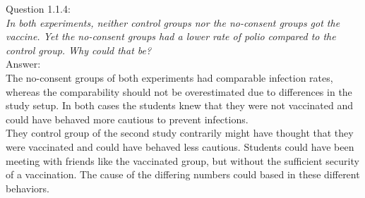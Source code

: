 
Question 1.1.4:\\	
\textsl{In both experiments, neither control groups nor the no-consent groups got the vaccine. Yet the no-consent groups had a lower rate of polio compared to the control group. Why could that be?}\\

Answer:\\
The no-consent groups of both experiments had comparable infection rates, whereas the comparability should not be overestimated due to differences in the study setup. In both cases the students knew that they were not vaccinated and could have behaved more cautious to prevent infections.\\

They control group of the second study contrarily might have thought that they were vaccinated and could have behaved less cautious. Students could have been meeting with friends like the vaccinated group, but without the sufficient security of a vaccination. The cause of the differing numbers could based in these different behaviors.\\
